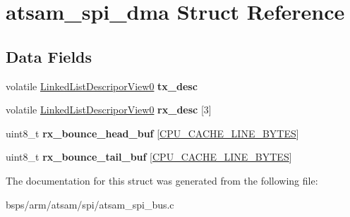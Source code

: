 \hypertarget{structatsam__spi__dma}{}\section{atsam\+\_\+spi\+\_\+dma Struct Reference}
\label{structatsam__spi__dma}
\subsection*{Data Fields}
\begin{DoxyCompactItemize}
\item 
\mbox{\label{structatsam__spi__dma_adcb5d17f5e1c42ae6d659ce1569b0f4d}} 
volatile \mbox{\hyperlink{group__dmad__structs_gaa6ecd4b62525e312f343d125a8fa5e6b}{Linked\+List\+Descripor\+View0}} {\bfseries tx\+\_\+desc}
\item 
\mbox{\label{structatsam__spi__dma_abb79553535acbe50ae3a0a6297b70166}} 
volatile \mbox{\hyperlink{group__dmad__structs_gaa6ecd4b62525e312f343d125a8fa5e6b}{Linked\+List\+Descripor\+View0}} {\bfseries rx\+\_\+desc} \mbox{[}3\mbox{]}
\item 
\mbox{\label{structatsam__spi__dma_af1208414a9e2564d181725dd4235b9e4}} 
uint8\+\_\+t {\bfseries rx\+\_\+bounce\+\_\+head\+\_\+buf} \mbox{[}\mbox{\hyperlink{no__cpu_2include_2rtems_2score_2cpu_8h_aafa1399e268a9ae6adf6d6aad4371688}{C\+P\+U\+\_\+\+C\+A\+C\+H\+E\+\_\+\+L\+I\+N\+E\+\_\+\+B\+Y\+T\+ES}}\mbox{]}
\item 
\mbox{\label{structatsam__spi__dma_a0a8b5538d832a2f1023a9e8ae3a45138}} 
uint8\+\_\+t {\bfseries rx\+\_\+bounce\+\_\+tail\+\_\+buf} \mbox{[}\mbox{\hyperlink{no__cpu_2include_2rtems_2score_2cpu_8h_aafa1399e268a9ae6adf6d6aad4371688}{C\+P\+U\+\_\+\+C\+A\+C\+H\+E\+\_\+\+L\+I\+N\+E\+\_\+\+B\+Y\+T\+ES}}\mbox{]}
\end{DoxyCompactItemize}


The documentation for this struct was generated from the following file\+:\begin{DoxyCompactItemize}
\item 
bsps/arm/atsam/spi/atsam\+\_\+spi\+\_\+bus.\+c\end{DoxyCompactItemize}

